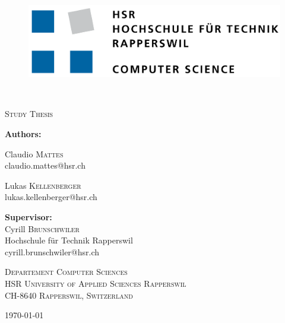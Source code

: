 \begin{titlepage}
	\centering
	\begin{figure}
		\centering
		\includegraphics[width=0.7\linewidth]{./assets/logo/hsr.png}  	
	\end{figure}
	\
	\vfill
	{\huge\bfseries \TITLE\par}
	\vspace{5mm}
	{\scshape\Large Study Thesis\par}
	\vfill

	{\Large\textbf{Authors:} \\\vspace{0.2cm}}
	{\Large Claudio \textsc{Mattes} \\\small claudio.mattes@hsr.ch \par\vspace{0.2cm}
	\Large Lukas \textsc{Kellenberger} \\\small lukas.kellenberger@hsr.ch}

	\vspace{0.6cm}
	{\Large\textbf{Supervisor:} \\\vspace{0.2cm}}
	Cyrill \textsc{Brunschwiler}  \\ {\small Hochschule für Technik Rapperswil} \\\small cyrill.brunschwiler@hsr.ch \\


	\vfill
	{\scshape\scriptsize Departement Computer Sciences \\ HSR University of Applied Sciences Rapperswil \\ CH-8640 Rapperswil, Switzerland \par}
	\vfill

    {\large \today}
\end{titlepage}